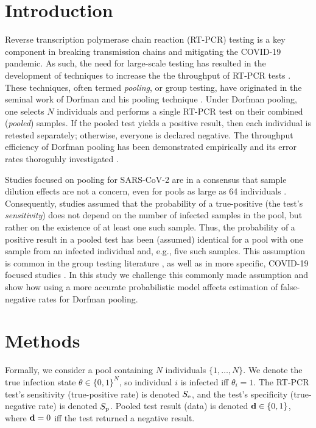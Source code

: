 \documentclass{article}
\begin{document}
\section*{Introduction}
Reverse transcription polymerase chain reaction (RT-PCR) testing is a
key component in breaking transmission chains and mitigating the
COVID-19 pandemic. As such, the need for large-scale testing has
resulted in the development of techniques to increase the the
throughput of RT-PCR tests \cite{DorfmanYuvalDor, PoolSize30,
  BayesianDorfman, MatrixPooling, LionDorfman}. These techniques,
often termed \emph{pooling}, or group testing, have originated in the
seminal work of Dorfman and his pooling technique
\cite{DorfmanOriginal, DorfmanYuvalDor}. Under Dorfman pooling, one
selects $N$ individuals and performs a single RT-PCR test on their
combined (\emph{pooled}) samples. If the pooled test yields a positive
result, then each individual is retested separately; otherwise,
everyone is declared negative. The throughput efficiency of Dorfman
pooling has been demonstrated empirically \cite{DorfmanYuvalDor} and
its error rates thoroguhly investigated \cite{Kim, Simplistic1,
  OptimalDorfmanPool}.

Studies focused on pooling for SARS-CoV-2 are in a consensus that
sample dilution effects \cite{DilutionHIV, GroupDilution} are not a
concern, even for pools as large as 64 individuals \cite{PoolSize30,
  Lion, DorfmanYuvalDor, DilutionCOVID}. Consequently, studies assumed
that the probability of a true-positive (the test's
\emph{sensitivity}) does not depend on the number of infected samples
in the pool, but rather on the existence of at least one such
sample. Thus, the probability of a positive result in a pooled test
has been (assumed) identical for a pool with one sample from an
infected individual and, e.g., five such samples. This assumption is
common in the group testing literature \cite{Kim, OptimalDorfmanPool},
as well as in more specific, COVID-19 focused studies
\cite{Simplistic1, Simplistic2}. In this study we challenge this
commonly made assumption and show how using a more accurate
probabilistic model affects estimation of false-negative rates for
Dorfman pooling.

\section*{Methods}
Formally, we consider a pool containing $N$ individuals
$\{1,\dots,N\}$. We denote the true infection state $\theta \in
\{0,1\}^N$, so individual $i$ is infected iff $\theta_i=1$. The RT-PCR
test's sensitivity (true-positive rate) is denoted $S_{\text{e}}$, and the
test's specificity (true-negative rate) is denoted $S_{\text{p}}$. Pooled
test result (data) is denoted $\mathbf{d} \in \{0,1\}$, where $\mathbf{d}=0$ iff
the test returned a negative result.
\end{document}
